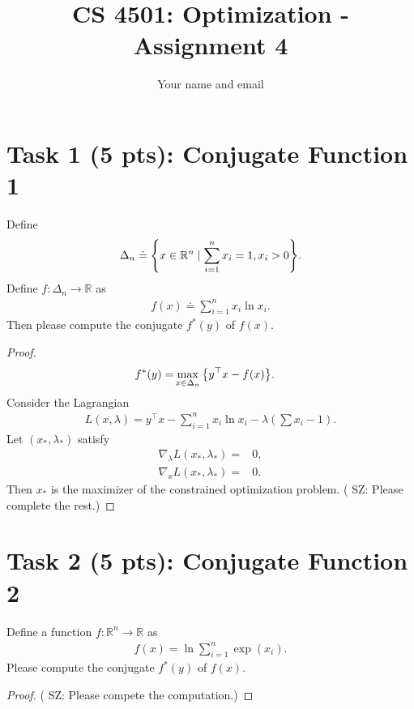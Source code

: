 \documentclass[11pt]{article}
\newcommand{\sz}[1]{({\color{blue} {SZ: #1}})}
\newcommand{\R}{\mathbb{R}}
\begin{document}
\title{CS 4501: Optimization - Assignment 4}
\author{Your name and email}
\date{}
\maketitle

\section*{Task 1 (5 pts): Conjugate Function 1}
Define 
\begin{align}
  \Delta_n \doteq \qty{ x \in \R^n \mid \sum_{i=1}^n x_i = 1, x_i > 0}.
\end{align}
Define $f: \Delta_n \to \R$ as
\begin{align}
  f(x) \doteq \sum_{i=1}^n x_i \ln x_i.
\end{align}
Then please compute the conjugate $f^*(y)$ of $f(x)$.
\begin{proof}
  \begin{align}
    f^*(y) =& \max_{x \in \Delta_n}\qty{y^\top x - f(x)}.
  \end{align}
  Consider the Lagrangian
  \begin{align}
    L(x, \lambda) = y^\top x - \sum_{i=1}^n x_i \ln x_i - \lambda (\sum x_i - 1).
  \end{align}
  Let $(x_*, \lambda_*)$ satisfy
  \begin{align}
    \nabla_\lambda L(x_*, \lambda_*) =& 0, \\
    \nabla_x L(x_*, \lambda_*) =& 0.
  \end{align}
  Then $x_*$ is the maximizer of the constrained optimization problem.
  \sz{Please complete the rest.}
\end{proof}


\section*{Task 2 (5 pts): Conjugate Function 2}
Define a function $f: \R^n \to \R$ as
\begin{align}
  f(x) = \ln\sum_{i=1}^n \exp(x_i).
\end{align}
Please compute the conjugate $f^*(y)$ of $f(x)$.

\begin{proof}
  \sz{Please compete the computation.}
\end{proof}
\end{document}

